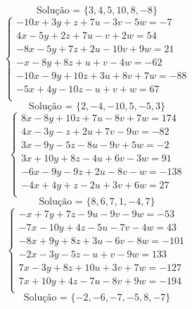 \documentclass[12pt,oneside,a4paper]{article}
\begin{document}
\begin{equation*}
\text{Solução = }\{3,4,5,10,8,-8\}
\end{equation*}
\vspace{\baselineskip}
\begin{equation*}
\begin{cases}
-10x+3y+z+7u-3v-5w=-7 \\
4x-5y+2z+7u-v+2w=54 \\
-8x-5y+7z+2u-10v+9w=21 \\
-x-8y+8z+u+v-4w=-62 \\
-10x-9y+10z+3u+8v+7w=-88 \\
-5x+4y-10z-u+v+w=67 \\
\end{cases}
\end{equation*}
\begin{equation*}
\text{Solução = }\{2,-4,-10,5,-5,3\}
\end{equation*}
\vspace{\baselineskip}
\begin{equation*}
\begin{cases}
8x-8y+10z+7u-8v+7w=174 \\
4x-3y-z+2u+7v-9w=-82 \\
3x-9y-5z-8u-9v+5w=-2 \\
3x+10y+8z-4u+6v-3w=91 \\
-6x-9y-9z+2u-8v-w=-138 \\
-4x+4y+z-2u+3v+6w=27 \\
\end{cases}
\end{equation*}
\begin{equation*}
\text{Solução = }\{8,6,7,1,-4,7\}
\end{equation*}
\vspace{\baselineskip}
\begin{equation*}
\begin{cases}
-x+7y+7z-9u-9v-9w=-53 \\
-7x-10y+4z-5u-7v-4w=43 \\
-8x+9y+8z+3u-6v-8w=-101 \\
-2x-3y-5z-u+v-9w=133 \\
7x-3y+8z+10u+3v+7w=-127 \\
7x+10y+4z-7u-8v+9w=-194 \\
\end{cases}
\end{equation*}
\begin{equation*}
\text{Solução = }\{-2,-6,-7,-5,8,-7\}
\end{equation*}
\end{document}
